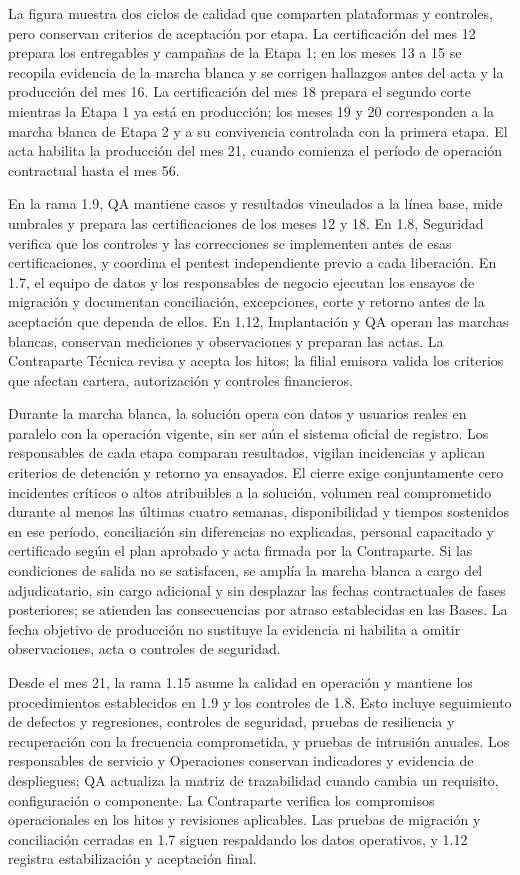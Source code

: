 \documentclass[11pt]{article}
\begin{document}
La figura muestra dos ciclos de calidad que comparten plataformas y controles, pero conservan criterios de aceptación por etapa. La certificación del mes 12 prepara los entregables y campañas de la Etapa 1; en los meses 13 a 15 se recopila evidencia de la marcha blanca y se corrigen hallazgos antes del acta y la producción del mes 16. La certificación del mes 18 prepara el segundo corte mientras la Etapa 1 ya está en producción; los meses 19 y 20 corresponden a la marcha blanca de Etapa 2 y a su convivencia controlada con la primera etapa. El acta habilita la producción del mes 21, cuando comienza el período de operación contractual hasta el mes 56.

En la rama 1.9, QA mantiene casos y resultados vinculados a la línea base, mide umbrales y prepara las certificaciones de los meses 12 y 18. En 1.8, Seguridad verifica que los controles y las correcciones se implementen antes de esas certificaciones, y coordina el pentest independiente previo a cada liberación. En 1.7, el equipo de datos y los responsables de negocio ejecutan los ensayos de migración y documentan conciliación, excepciones, corte y retorno antes de la aceptación que dependa de ellos. En 1.12, Implantación y QA operan las marchas blancas, conservan mediciones y observaciones y preparan las actas. La Contraparte Técnica revisa y acepta los hitos; la filial emisora valida los criterios que afectan cartera, autorización y controles financieros.

Durante la marcha blanca, la solución opera con datos y usuarios reales en paralelo con la operación vigente, sin ser aún el sistema oficial de registro. Los responsables de cada etapa comparan resultados, vigilan incidencias y aplican criterios de detención y retorno ya ensayados. El cierre exige conjuntamente cero incidentes críticos o altos atribuibles a la solución, volumen real comprometido durante al menos las últimas cuatro semanas, disponibilidad y tiempos sostenidos en ese período, conciliación sin diferencias no explicadas, personal capacitado y certificado según el plan aprobado y acta firmada por la Contraparte. Si las condiciones de salida no se satisfacen, se amplía la marcha blanca a cargo del adjudicatario, sin cargo adicional y sin desplazar las fechas contractuales de fases posteriores; se atienden las consecuencias por atraso establecidas en las Bases. La fecha objetivo de producción no sustituye la evidencia ni habilita a omitir observaciones, acta o controles de seguridad.

Desde el mes 21, la rama 1.15 asume la calidad en operación y mantiene los procedimientos establecidos en 1.9 y los controles de 1.8. Esto incluye seguimiento de defectos y regresiones, controles de seguridad, pruebas de resiliencia y recuperación con la frecuencia comprometida, y pruebas de intrusión anuales. Los responsables de servicio y Operaciones conservan indicadores y evidencia de despliegues; QA actualiza la matriz de trazabilidad cuando cambia un requisito, configuración o componente. La Contraparte verifica los compromisos operacionales en los hitos y revisiones aplicables. Las pruebas de migración y conciliación cerradas en 1.7 siguen respaldando los datos operativos, y 1.12 registra estabilización y aceptación final.
\end{document}
